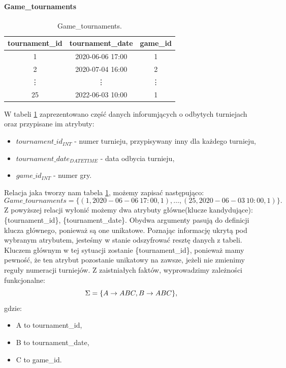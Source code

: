 \documentclass{article}
\theoremstyle{break}
\begin{document}
	\paragraph{Game\_tournaments}
	\begin{table}[!ht]
		\centering
		\begin{tabular}{|c|c|c|}
			\hline
			tournament\_id & tournament\_date & game\_id \\ \hline
			1 & 2020-06-06 17:00 & 1 \\ \hline
			2 & 2020-07-04 16:00 & 2 \\ \hline
			\vdots & \vdots & \vdots  \\ \hline
			25 & 2022-06-03 10:00 & 1 \\ \hline
		\end{tabular}
		\caption{Game\_tournaments.}
		\label{table:game_tournaments}
	\end{table}
	W tabeli \ref{table:game_tournaments} zaprezentowano część danych inforumjących o odbytych turniejach oraz przypisane im atrybuty:
	\begin{itemize}
		\item $tournament\_id_{INT}$ - numer turnieju, przypisywany inny dla każdego turnieju,
		\item $tournament\_date_{DATETIME}$ - data odbycia turnieju,
		\item $game\_id_{INT}$ - numer gry.
	\end{itemize}
	Relacja jaka tworzy nam tabela \ref{table:game_tournaments}, możemy zapisać następująco:
	$$Game\_tournaments=\{(1,2020-06-06 \ 17:00, 1),\dots,(25,2020-06-03 \ 10:00, 1)\}.$$
	Z powyższej relacji wyłonić możemy dwa atrybuty główne(klucze kandydujące): \{tournament\_id\}, \{tournament\_date\}. Obydwa argumenty pasują do definicji klucza głównego, ponieważ są one unikatowe. Poznając informację ukrytą pod wybranym atrybutem, jesteśmy w stanie odszyfrować resztę danych z tabeli. Kluczem głównym w tej sytuacji zostanie \{tournament\_id\}, ponieważ mamy pewność, że ten atrybut pozostanie unikatowy na zawsze, jeżeli nie zmienimy reguły numeracji turniejów. Z zaistniałych faktów, wyprowadzimy zależności funkcjonalne:
	$$ \Sigma = \{A \rightarrow ABC, B \rightarrow ABC\}, \\ $$
	gdzie:
	\begin{itemize}
		\item A to tournament\_id,
		\item B to tournament\_date,
		\item C to game\_id.
	\end{itemize}
\end{document}
